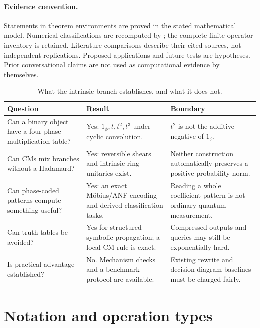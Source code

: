 \documentclass[11pt,a4paper]{article}
\theoremstyle{definition}\newtheorem{definition}[theorem]{Definition}
\theoremstyle{remark}\newtheorem{remark}[theorem]{Remark}
\newcommand{\one}{1_{\phi}}
\newcommand{\code}[1]{\texttt{\detokenize{#1}}}
\numberwithin{equation}{section}
\begin{document}
\paragraph{Evidence convention.}
Statements in theorem environments are proved in the stated mathematical model. Numerical classifications are recomputed by \code{code/verify_intrinsic.py}; the complete finite operator inventory is retained. Literature comparisons describe their cited sources, not independent replications. Proposed applications and future tests are hypotheses. Prior conversational claims are not used as computational evidence by themselves.

\begin{table}[htbp]\centering\small
\begin{tabularx}{\textwidth}{@{}L{0.24\textwidth}Y L{0.25\textwidth}@{}}\toprule
Question & Result & Boundary\\\midrule
Can a binary object have a four-phase multiplication table? & Yes: $\one,t,t^2,t^3$ under cyclic convolution. & $t^2$ is not the additive negative of $\one$.\\
Can CMs mix branches without a Hadamard? & Yes: reversible shears and intrinsic ring-unitaries exist. & Neither construction automatically preserves a positive probability norm.\\
Can phase-coded patterns compute something useful? & Yes: an exact M\"obius/ANF encoding and derived classification tasks. & Reading a whole coefficient pattern is not ordinary quantum measurement.\\
Can truth tables be avoided? & Yes for structured symbolic propagation; a local CM rule is exact. & Compressed outputs and queries may still be exponentially hard.\\
Is practical advantage established? & No. Mechanism checks and a benchmark protocol are available. & Existing rewrite and decision-diagram baselines must be charged fairly.\\\bottomrule
\end{tabularx}
\caption{What the intrinsic branch establishes, and what it does not.}
\end{table}

\section{Notation and operation types}\label{sec:types}
\end{document}
